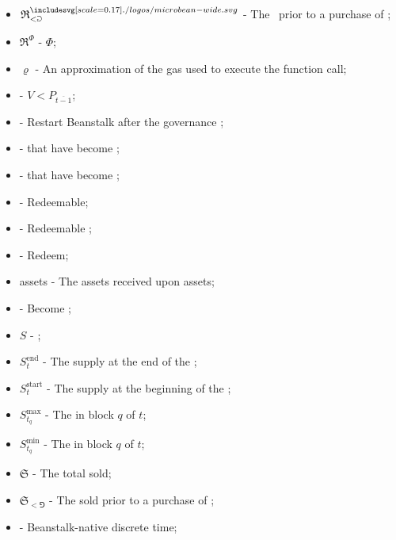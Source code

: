 \documentclass[class=article, crop=false]{standalone}
\begin{document}
\begin{itemize}[topsep=0pt, itemsep=3pt,leftmargin=16pt]
    \item[] $\mathfrak{R}_{<\Game}^{\bean}$ - \hypertarget{ht159}{The  \Bean\ prior to a purchase of };
    \item[] $\mathfrak{R}^{\Phi}$ - \hypertarget{ht160}{ $\Phi$};
    \item[] $\varrho$ - An approximation of the gas used to execute the  function call;
    \item[]  - \hypertarget{ht161}{$V < P_{\overline{t-1}}$};
    \item[]  - \hypertarget{ht162}{Restart Beanstalk after the governance };
    \item[]  - \hypertarget{ht163}{ that have become };
    \item[]  - \hypertarget{ht164}{ that have become };
    \item[]  - \hypertarget{ht165}{Redeemable};
    \item[]  - \hypertarget{ht166}{Redeemable };
    \item[]  - \hypertarget{ht167}{Redeem};
    \item[]  assets - \hypertarget{ht168}{The assets received upon   assets};
    \item[]  - \hypertarget{ht169}{Become };
    \item[] $S$ - \hypertarget{ht170}{};
    \item[] $S_t^{\text{end}}$ - \hypertarget{ht171}{The  supply at the end of the };
    \item[] $S_t^{\text{start}}$ - \hypertarget{ht173}{The  supply at the beginning of the };
    \item[] $S_{t_q}^{\text{max}}$ - The  in block $q$ of $t$;
    \item[] $S_{t_q}^{\text{min}}$ - The  in block $q$ of $t$;
    \item[] $\mathfrak{S}$ - \hypertarget{ht174}{The total  sold};
    \item[] $\mathfrak{S}_{<\Game}$ - \hypertarget{ht175}{The  sold prior to a purchase of };
    \item[]  - \hypertarget{ht176}{Beanstalk-native discrete time};

\end{itemize}
\end{document}
